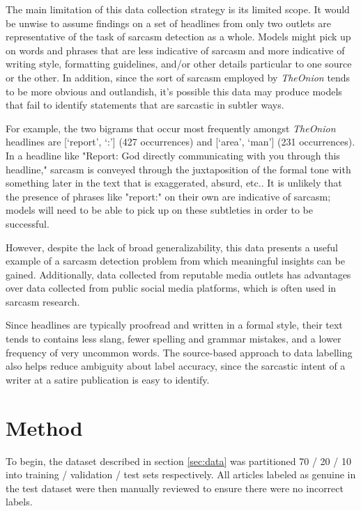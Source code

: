 \documentclass[11pt]{article}
\begin{document}
The main limitation of this data collection strategy is its limited scope. It
would be unwise to assume findings on a set of headlines from only two outlets
are representative of the task of sarcasm detection as a whole. Models might
pick up on words and phrases that are less indicative of sarcasm and more
indicative of writing style, formatting guidelines, and/or other details
particular to one source or the other. In addition, since the sort of sarcasm
employed by \textit{TheOnion} tends to be more obvious and outlandish, it's
possible this data may produce models that fail to identify statements that are
sarcastic in subtler ways. 

For example, the two bigrams that occur most frequently amongst
\textit{TheOnion} headlines are [`report', `:'] (427 occurrences) and [`area',
`man'] (231 occurrences). In a headline like "Report: God directly
communicating with you through this headline," sarcasm is conveyed through the
juxtaposition of the formal tone with something later in the text that is
exaggerated, absurd, etc.. It is unlikely that the presence of phrases like
"report:" on their own are indicative of sarcasm; models will need to be able
to pick up on these subtleties in order to be successful.

However, despite the lack of broad generalizability, this data presents a
useful example of a sarcasm detection problem from which meaningful insights
can be gained. Additionally, data collected from reputable media outlets has
advantages over data collected from public social media platforms, which is
often used in sarcasm research.

Since headlines are typically proofread and written in a formal style, their
text tends to contains less slang, fewer spelling and grammar mistakes, and a
lower frequency of very uncommon words. The source-based approach to data
labelling also helps reduce ambiguity about label accuracy, since the sarcastic
intent of a writer at a satire publication is easy to identify.


\section{Method}

To begin, the dataset described in section \ref{sec:data} was partitioned 70 /
20 / 10 into training / validation / test sets respectively. All articles
labeled as genuine in the test dataset were then manually reviewed to ensure
there were no incorrect labels.
\end{document}
